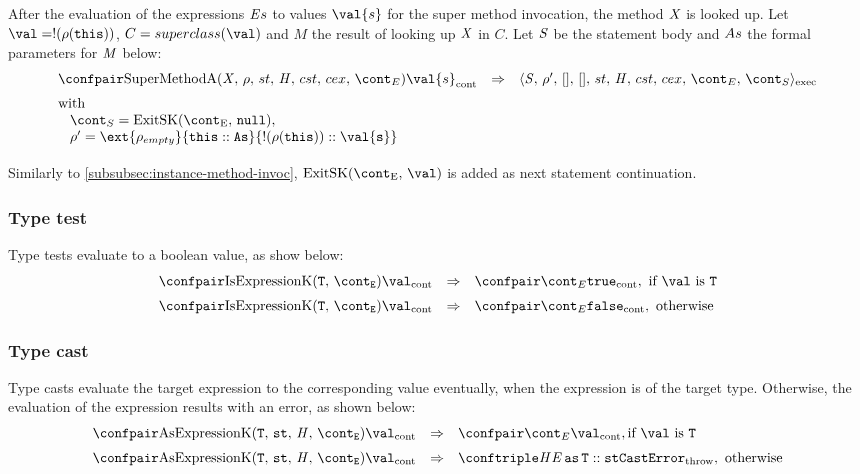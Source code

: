 \documentclass{article}
\begin{document}
After the evaluation of the expressions $\mathit{E}{s}$ to values $\val{s}$ for the super method invocation, the method $\mathit{X}$ is looked up.
Let $\val = \deref{(\env(\this))}$, $C = \superclass{\val}$ and $M$ the result of looking up $\mathit{X}$ in $C$.
Let $\mathit{S}$ be the statement body and $As$ the formal parameters for $\mathit{M}$ below:
\[
  \begin{array}{lcl}
	\cesktrans{
		\contconf{\SuperMethodA}{\val{s}}}{
		\execconf{\stmt}{\env'}{[]}{[]}{\handler}{\cstrace}{\cex}{\econt}{\scont}}
	\\[2mm]
	\textrm{with }\\
	\hspace{3mm}\scont = \ExitSK{\tt{null}},\\
	\hspace{3mm}\env' = \ext{\env_{empty}}{\this :: \formals}{\deref{(\env(\this))} :: \val{s}}\\[2mm]
  \end{array}
\]
Similarly to \ref{subsubsec:instance-method-invoc}, $\ExitSK{\val}$ is added as next statement continuation.

\subsubsection{Type test}
\label{subsubsec:type-test}
Type tests evaluate to a boolean value, as show below:
\[
  \begin{array}{lcl}
	\cesktrans{
		\contconf{\IsExpressionK}{\val}}{
		\contconf{\econt}{\true}},
		\textrm{ if }\val \textrm{ is } \tt{T}\\[2mm]

	\cesktrans{
		\contconf{\IsExpressionK}{\val}}{
		\contconf{\econt}{\false}}, \textrm{ otherwise}
  \end{array}
\]

\subsubsection{Type cast}
\label{subsubsec:type-cast}
Type casts evaluate the target expression to the corresponding value eventually, when the expression is of the target type.
Otherwise, the evaluation of the expression results with an error, as shown below:
\[
  \begin{array}{lcl}
	\cesktrans{
		\contconf{\AsExpressionK}{\val}}{
		\contconf{\econt}{\val}}, \textrm{if }\val \textrm{ is } \tt{T}\\[2mm]

	\cesktrans{
		\contconf{\AsExpressionK}{\val}}{
		\throwconf{\handler}{\AsExpression{\expressionmeta}{\tt{T}} :: \strace}{\tt{CastError}}}, \textrm{ otherwise}
    \end{array}
\]
\end{document}
